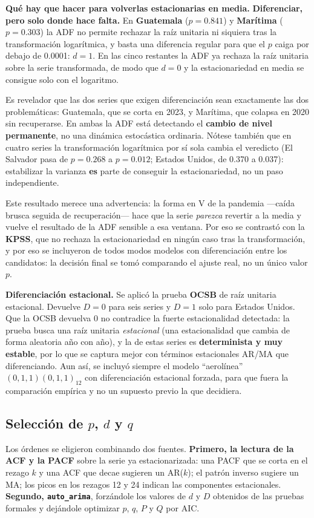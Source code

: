 \documentclass[12pt,letterpaper]{article}
\newcommand{\subseccion}[1]{\subsection{#1}}
\begin{document}
\textbf{Qué hay que hacer para volverlas estacionarias en media.} \textbf{Diferenciar, pero solo
donde hace falta.} En \textbf{Guatemala} ($p = 0.841$) y \textbf{Marítima} ($p = 0.303$) la ADF
no permite rechazar la raíz unitaria ni siquiera tras la transformación logarítmica, y basta una
diferencia regular para que el $p$ caiga por debajo de 0.0001: \textbf{$d = 1$}. En las cinco
restantes la ADF ya rechaza la raíz unitaria sobre la serie transformada, de modo que
\textbf{$d = 0$} y la estacionariedad en media se consigue solo con el logaritmo.

Es revelador que las dos series que exigen diferenciación sean exactamente las dos
problemáticas: Guatemala, que se corta en 2023, y Marítima, que colapsa en 2020 sin recuperarse.
En ambas la ADF está detectando el \textbf{cambio de nivel permanente}, no una dinámica
estocástica ordinaria. Nótese también que en cuatro series la transformación logarítmica por sí
sola cambia el veredicto (El Salvador pasa de $p = 0.268$ a $p = 0.012$; Estados Unidos, de
0.370 a 0.037): estabilizar la varianza \textbf{es} parte de conseguir la estacionariedad, no un
paso independiente.

Este resultado merece una advertencia: la forma en V de la pandemia ---caída brusca seguida de
recuperación--- hace que la serie \textit{parezca} revertir a la media y vuelve el resultado de
la ADF sensible a esa ventana. Por eso se contrastó con la \textbf{KPSS}, que no rechaza la
estacionariedad en ningún caso tras la transformación, y por eso se incluyeron de todos modos
modelos con diferenciación entre los candidatos: la decisión final se tomó comparando el ajuste
real, no un único valor $p$.

\textbf{Diferenciación estacional.} Se aplicó la prueba \textbf{OCSB} de raíz unitaria
estacional. Devuelve $D = 0$ para seis series y $D = 1$ solo para Estados Unidos. Que la OCSB
devuelva 0 no contradice la fuerte estacionalidad detectada: la prueba busca una raíz unitaria
\textit{estacional} (una estacionalidad que cambia de forma aleatoria año con año), y la de
estas series es \textbf{determinista y muy estable}, por lo que se captura mejor con términos
estacionales AR/MA que diferenciando. Aun así, se incluyó siempre el modelo ``aerolínea''
$(0,1,1)(0,1,1)_{12}$ con diferenciación estacional forzada, para que fuera la comparación
empírica y no un supuesto previo la que decidiera.

\subseccion{Selección de $p$, $d$ y $q$}

Los órdenes se eligieron combinando dos fuentes. \textbf{Primero, la lectura de la ACF y la
PACF} sobre la serie ya estacionarizada: una PACF que se corta en el rezago $k$ y una ACF que
decae sugieren un AR($k$); el patrón inverso sugiere un MA; los picos en los rezagos 12 y 24
indican las componentes estacionales. \textbf{Segundo, \texttt{auto\_arima}}, forzándole los
valores de $d$ y $D$ obtenidos de las pruebas formales y dejándole optimizar $p$, $q$, $P$ y $Q$
por AIC.
\end{document}

